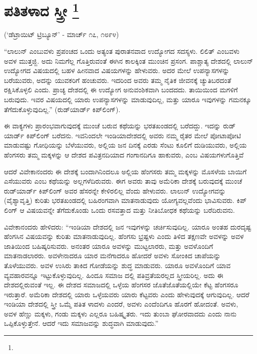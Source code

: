 
\chapter[ಪತಿತಳಾದ ಸ್ತ್ರೀ ]{ಪತಿತಳಾದ ಸ್ತ್ರೀ \protect\footnote{}}

\centerline{(‘ಡೆಟ್ರಾಯಿಟ್​ ಟ್ರಿಬ್ಯೂನ್​’ - ಮಾರ್ಚ್​ ೧೭, ೧೮೯೪)}

“ಲಾಲುನ್​ ಎಂಬುವಳು ಪ್ರಪಂಚದ ಒಂದು ಅತ್ಯಂತ ಪುರಾತನವಾದ ಉದ್ಯೋಗದ ಸದಸ್ಯಳು. ಲಿಲಿತ್​ ಎಂಬವಳು ಅವಳ ಮುತ್ತಜ್ಜಿ. ಅದು ನಿಮಗೆಲ್ಲ ಗೊತ್ತಿರುವಂತೆ ಈಗಿನ ಕಾಲಕ್ಕಿಂತ ಮುಂಚಿನ ಪ್ರಸಂಗ. ಪಾಶ್ಚಾತ್ಯ ದೇಶದಲ್ಲಿ ಲಾಲುನ್​ ಉದ್ಯೋಗದ ವಿಷಯದಲ್ಲಿ ಬಹಳ ಹೀನವಾದ ವಿಷಯಗಳನ್ನು ಹೇಳುವರು. ಅದರ ಮೇಲೆ ಉಪನ್ಯಾಸಗಳನ್ನು ಬರೆಯುವರು, ಅದನ್ನು ಯುವಕರಿಗೆ ಹಂಚುವರು. ಇದರಿಂದ ಅವರು ತಮ್ಮ ನೈತಿಕ ಜೀವನಕ್ಕೆ ಚ್ಯುತಿಬರದಂತೆ ರಕ್ಷಿಸಿಕೊಳ್ಳಲಿ ಎಂದು. ಪ್ರಾಚ್ಯ ದೇಶದಲ್ಲಿ ಈ ಉದ್ಯೋಗ ಅನುವಂಶಿಕವಾಗಿ ಬಂದದದು. ತಾಯಿಯಿಂದ ಮಗಳಿಗೆ ಬರುವುದು. ಇವರ ವಿಷಯದಲ್ಲಿ ಯಾರು ಉಪನ್ಯಾಸಗಳನ್ನು ಮಾಡುವುದಿಲ್ಲ, ಮತ್ತು ಯಾರೂ ಇವುಗಳನ್ನು ಗಮನಕ್ಕೂ ತೆಗೆದುಕೊಳ್ಳುವುದಿಲ್ಲ.” (ರುಡ್​ಯಾರ್ಡ್​ ಕಿಪ್​ಲಿಂಗ್​).

ಈ ವಾಕ್ಯಗಳು ಪ್ರಾರಂಭವಾಗುವುದಕ್ಕೆ ಮುಂಚೆ ಬರುವ ಕಥೆಯನ್ನು ಭರತಖಂಡದಲ್ಲಿ ಬರೆದದ್ದು. ಇದನ್ನು ರುಡ್​ಯಾರ್ಡ್​ ಕಿಪ್​ಲಿಂಗ್​ ಬರೆದನು. ಇವನಿಂದಲೇ ಇಂಡಿಯಾದೇಶದಲ್ಲಿ ಅವರು ನಮ್ಮ ರೈತರ ಮೇಲೆ ಪೋಟಾಪೋಟಿ ಮಾಡುವಷ್ಟು ಗೋಧಿಯನ್ನು ಬೆಳೆಯುವರು, ಅಲ್ಲಿಯ ಜನ ದಿನಕ್ಕೆ ಎರಡು ಸೆಂಟು ಕೂಲಿಗೆ ದುಡಿಯುವರು, ಅಲ್ಲಿಯ ಹೆಂಗಸರು ತಮ್ಮ ಮಕ್ಕಳನ್ನು ಆ ದೇಶದ ಪವಿತ್ರನದಿಯಾದ ಗಂಗಾನದಿಗೂ ಹಾಕುವರು, ಎಂಬ ವಿಷಯಗಳುಗೊತ್ತಿವೆ

ಆದರೆ ವಿವೇಕಾನಂದರು ಈ ದೇಶಕ್ಕೆ ಬಂದಾಗಿನಿಂದಲೂ ಅಲ್ಲಿಯ ಹೆಂಗಸರು ತಮ್ಮ ಮಕ್ಕಳನ್ನು ಮೊಸಳೆಯ ಬಾಯಿಗೆ ಎಸೆಯುವರು ಎಂಬ ಕಥೆಯನ್ನು ಅಲ್ಲಗಳೆದಿರುವರು. ಈಗ ಅವರು ತಾವು ಅಮೆರಿಕಾ ದೇಶಕ್ಕೆ ಬರುವುದಕ್ಕೆ ಮುಂಚೆ ರುಡ್​ಯಾರ್ಡ್​ ಕಿಪ್​ಲಿಂಗ್​ ಅವರ ಹೆಸರನ್ನೇ ಕೇಳಿರಲಿಲ್ಲ ವೆಂದು ಹೇಳುವರು. ಲಾಲುನ್​ ಉದ್ಯೋಗವನ್ನು (ವೈಶ್ಯಾವೃತ್ತಿ) ಕುರಿತು ಭರತಖಂಡದಲ್ಲಿ ಬಹಿರಂಗವಾಗಿ ಮಾತನಾಡುವುದು ಯೋಗ್ಯವಲ್ಲವೆಂದು ಭಾವಿಸುವರು. ಕಿಪ್​ಲಿಂಗ್​ ಆ ವಿಷಯವನ್ನೇ ತೆಗೆದುಕೊಂಡು ಒಂದು ರಸವತ್ತಾದ ಮತ್ತು ನೀತಿಬೋಧಕ ಕಥೆಯನ್ನು ಬರೆದಿರುವನು.

ವಿವೇಕಾನಂದರು ಹೇಳಿದರು: “ಇಂಡಿಯಾ ದೇಶದಲ್ಲಿ ಜನ ಇವುಗಳನ್ನು ಚರ್ಚಿಸುವುದಿಲ್ಲ. ಯಾರೂ ಅಂತಹ ದುರದೃಷ್ಟ ಹೆಂಗಸಿನ ವಿಷಯವನ್ನು ಕುರಿತು ಮಾತನಾಡುವುದಿಲ್ಲ. ಹೆಂಗಸು ಭ್ರಷ್ಟಳು ಎಂದು ತಿಳಿದ ತಕ್ಷಣವೇ ಅವಳನ್ನು ಅವಳ ಜಾತಿಯಿಂದ ಬಹಿಷ್ಕರಿಸುವರು. ಅನಂತರ ಯಾರೂ ಅವಳನ್ನು ಮುಟ್ಟಲಾರರು, ಮತ್ತು ಅವಳೊಂದಿಗೆ ಮಾತನಾಡಲಾರರು. ಅವಳೇನಾದರೂ ಯಾರ ಮನೆಗಾದರೂ ಹೋದರೆ ಅವಳು ಸೋಂಕಿದ ಚಾಪೆಯನ್ನು ತೊಳೆಯುವರು. ಅವಳ ಉಸಿರು ತಾಕಿದ ಗೋಡೆಯನ್ನು ಶುದ್ಧ ಮಾಡುವರು. ಯಾರೂ ಅವಳೊಂದಿಗೆ ಯಾವ ವ್ಯವಹಾರವನ್ನೂ ಇಟ್ಟುಕೊಳ್ಳುವುದಿಲ್ಲ. ಹಿಂದೂ ಸಮಾಜ ದಲ್ಲಿ ಪತಿವ್ರತೆಯರಲ್ಲದ ಸ್ತ್ರೀಯರಿಲ್ಲ. ಅದು ಈ ದೇಶದಲ್ಲಿರುವಂತೆ ಇಲ್ಲ. ಈ ದೇಶದ ಸಮಾಜದಲ್ಲಿ ಒಳ್ಳೆಯ ಹೆಂಗಸರ ಜೊತೆಜೊತೆಯಲ್ಲಿಯೇ ಕೆಟ್ಟ ಹೆಂಗಸರೂ ಇರುತ್ತಾರೆ. ಅಮೆರಿಕಾ ದೇಶದಲ್ಲಿ ಯಾರು ಒಳ್ಳೆಯವರು ಯಾರು ಕೆಟ್ಟವರು ಎಂದು ಹೇಳುವುದಕ್ಕೆ ಆಗುವುದಿಲ್ಲ. ಆದರೆ ಇಂಡಿಯಾ ದೇಶದಲ್ಲಿ ಸ್ತ್ರೀ ಒಮ್ಮೆ ಪತಿತ ಳಾದಳು ಎಂದರೆ, ಅವಳು ಎಂದೆಂದಿಗೂ ಹೊರಗೆ ಹೋದಂತೆ. ಅವಳು, ಅವಳ ಹೆಣ್ಣು ಮಕ್ಕಳು, ಗಂಡು ಮಕ್ಕಳು ಎಲ್ಲರೂ ಬಹಿಷ್ಕೃತರು. ಇದು ತುಂಬಾ ಘೋರವಾದದು ಎಂದು ನಾನು ಒಪ್ಪಿಕೊಳ್ಳುತ್ತೇನೆ. ಆದರೆ ಇದು ಸಮಾಜವನ್ನು ಶುದ್ಧವಾಗಿ ಮಾಡುವುದು.”

